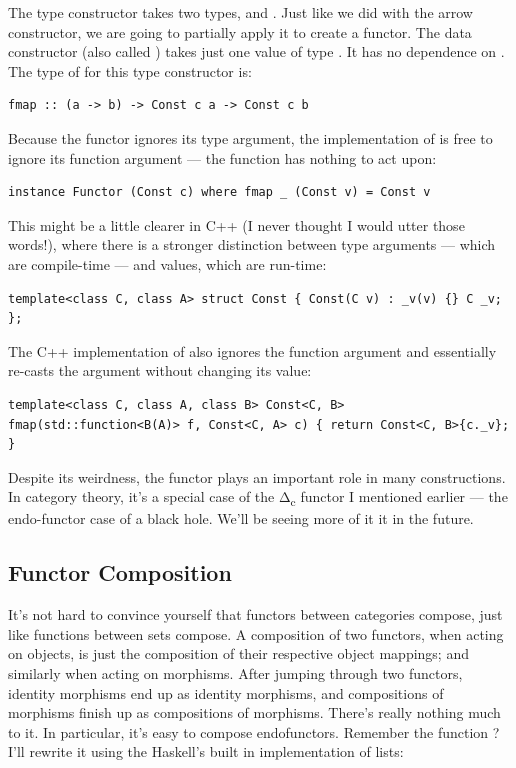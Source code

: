 The  type constructor takes two types,  and
. Just like we did with the arrow constructor, we are going to
partially apply it to create a functor. The data constructor (also
called ) takes just one value of type . It has
no dependence on . The type of  for this type
constructor is:

\begin{verbatim}
fmap :: (a -> b) -> Const c a -> Const c b
\end{verbatim}

Because the functor ignores its type argument, the implementation of
 is free to ignore its function argument --- the function
has nothing to act upon:

\begin{verbatim}
instance Functor (Const c) where fmap _ (Const v) = Const v
\end{verbatim}

This might be a little clearer in C++ (I never thought I would utter
those words!), where there is a stronger distinction between type
arguments --- which are compile-time --- and values, which are run-time:

\begin{verbatim}
template<class C, class A> struct Const { Const(C v) : _v(v) {} C _v; };
\end{verbatim}

The C++ implementation of  also ignores the function
argument and essentially re-casts the  argument without
changing its value:

\begin{verbatim}
template<class C, class A, class B> Const<C, B> fmap(std::function<B(A)> f, Const<C, A> c) { return Const<C, B>{c._v}; }
\end{verbatim}

Despite its weirdness, the  functor plays an important
role in many constructions. In category theory, it's a special case of
the Δ\textsubscript{c} functor I mentioned earlier --- the endo-functor
case of a black hole. We'll be seeing more of it it in the future.

\subsection{Functor Composition}\label{functor-composition}

It's not hard to convince yourself that functors between categories
compose, just like functions between sets compose. A composition of two
functors, when acting on objects, is just the composition of their
respective object mappings; and similarly when acting on morphisms.
After jumping through two functors, identity morphisms end up as
identity morphisms, and compositions of morphisms finish up as
compositions of morphisms. There's really nothing much to it. In
particular, it's easy to compose endofunctors. Remember the function
? I'll rewrite it using the Haskell's built in
implementation of lists:

